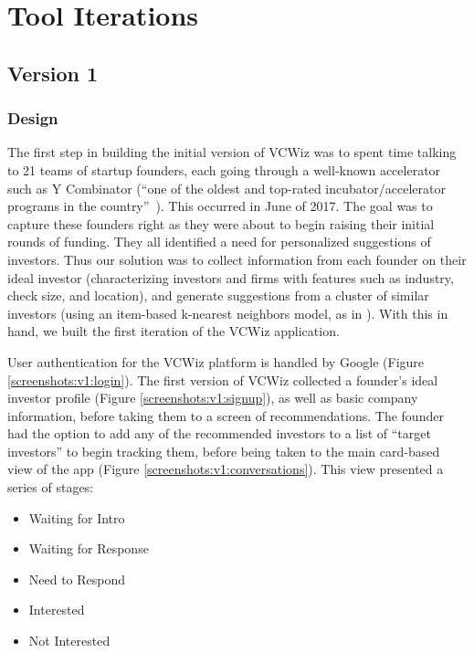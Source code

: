 \section{Tool Iterations}

\subsection{Version 1}

\subsubsection{Design}

The first step in building the initial version of VCWiz was to spent time talking to 21 teams of startup founders, each going through a well-known accelerator such as Y Combinator (``one of the oldest and top-rated incubator/accelerator programs in the country''~\cite{stross2013launch}). This occurred in June of 2017. The goal was to capture these founders right as they were about to begin raising their initial rounds of funding. They all identified a need for personalized suggestions of investors. Thus our solution was to collect information from each founder on their ideal investor (characterizing investors and firms with features such as industry, check size, and location), and generate suggestions from a cluster of similar investors (using an item-based k-nearest neighbors model, as in \cite{Stone:2013:EST:2541167.2507882}). With this in hand, we built the first iteration of the VCWiz application.

User authentication for the VCWiz platform is handled by Google (Figure \ref{screenshots:v1:login}). The first version of VCWiz collected a founder's ideal investor profile (Figure \ref{screenshots:v1:signup}), as well as basic company information, before taking them to a screen of recommendations. The founder had the option to add any of the recommended investors to a list of ``target investors'' to begin tracking them, before being taken to the main card-based view of the app (Figure \ref{screenshots:v1:conversations}). This view presented a series of stages:

\begin{multicols}{2}
\begin{itemize}
  \item Waiting for Intro
  \item Waiting for Response
  \item Need to Respond
  \item Interested
  \item Not Interested
\end{itemize}
\end{multicols}

